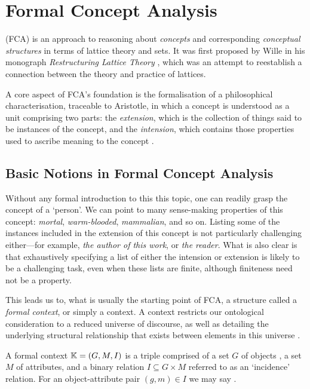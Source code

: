 \chapter{Formal Concept Analysis}
\label{chapter:formal-concept-analysis}

\FCA (FCA) \cite{Wille_Restructuring, WILLE1992493,ganter1999formal} is an approach to reasoning about \textit{concepts} and corresponding \textit{conceptual
structures} in terms of lattice theory and sets. It was first proposed by Wille in his monograph \textit{Restructuring Lattice Theory}
\cite{Wille_Restructuring}, which was an attempt to reestablish a connection between the theory and practice of lattices.

A core aspect of FCA’s foundation is the formalisation of a philosophical characterisation, traceable to Aristotle, in which a concept is understood
as a unit comprising two parts: the \textit{extension}, which is the collection of things said to be instances of the concept, and the \textit{intension},
which contains those properties used to ascribe meaning to the concept \cite{DUQUENNE1999407}.

\section{Basic Notions in Formal Concept Analysis}
\label{section:basic-notions}

Without any formal introduction to this this topic, one can readily grasp the concept of a `person'. We can point to many sense-making
properties of this concept: \textit{mortal}, \textit{warm-blooded}, \textit{mammalian}, and so on. Listing some of the instances included in
the extension of this concept is not particularly challenging either---for example, \textit{the author of this work}, or \textit{the reader}.
What is also clear is that exhaustively specifying a list of either the intension or extension is likely to be a challenging task, even when
these lists are finite, although finiteness need not be a property.

This leads us to, what is usually the starting point of FCA, a structure called a \textit{formal context}, or simply a context. A context
restricts our ontological consideration to a reduced universe of discourse, as well as detailing the underlying structural relationship that
exists between elements in this universe \cite{Wille_Restructuring,Dau2005}.

\begin{definition}
   \label{definition:formal-context} A formal context $\mathbb{K} = (G,M,\mathrel{I})$ is a triple comprised of a set $G$ of objects ,
  a set $M$ of attributes, and a binary relation $I \subseteq G \times M$ referred to as an `incidence' relation. For an object-attribute pair
  $(g,m) \in I$ we may say .
\end{definition}

